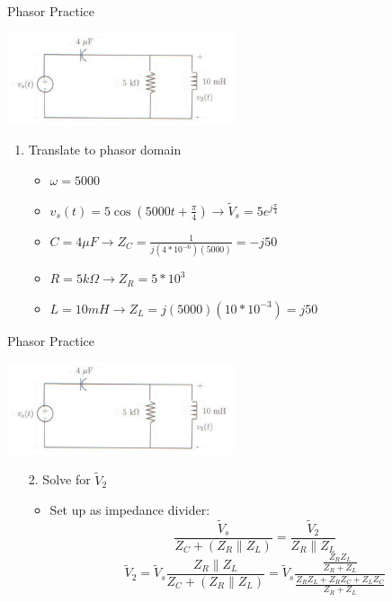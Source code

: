 \documentclass{beamer}
\begin{document}
    \begin{frame}{Phasor Practice}
        \begin{center}
            \includegraphics[width=0.5\textwidth]{phasor-practice.png}
        \end{center}
        \begin{enumerate}
            \item Translate to phasor domain
            \begin{itemize}
                \item $\omega=5000$
                \item $v_s(t)=5\cos(5000t+\frac{\pi}{4})\rightarrow \tilde{V}_s=5e^{j\frac{\pi}{4}}$
                \item $C=4\mu F\rightarrow Z_C=\frac{1}{j(4*10^{-6})(5000)}=-j50$
                \item $R=5k\Omega\rightarrow Z_R=5*10^3$
                \item $L=10mH\rightarrow Z_L=j(5000)(10*10^{-3})=j50$
            \end{itemize}
        \end{enumerate}
    \end{frame}
    
    \begin{frame}{Phasor Practice}
        \begin{center}
            \includegraphics[width=0.5\textwidth]{phasor-practice.png}
        \end{center}
        \begin{enumerate}
            \item[2.] Solve for $\tilde{V}_2$
            \begin{itemize}
                \item Set up as impedance divider: $$\frac{\tilde{V}_s}{Z_C+(Z_R\| Z_L)}=\frac{\tilde{V}_2}{Z_R\| Z_L}$$
                $$\tilde{V}_2=\tilde{V}_s\frac{Z_R\|Z_L}{Z_C+(Z_R\|Z_L)}=\tilde{V}_s\frac{\frac{Z_RZ_L}{Z_R+Z_L}}{\frac{Z_RZ_L+Z_RZ_C+Z_LZ_C}{Z_R+Z_L}}$$
            \end{itemize}
        \end{enumerate}
    \end{frame}
    
\end{document}
